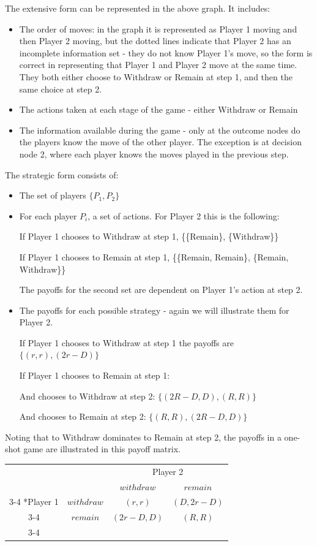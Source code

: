 \documentclass[11pt,a4paper]{article}
\begin{document}
The extensive form can be represented in the above graph. It includes:
\begin{itemize}
\item The order of moves: in the graph it is represented as Player 1 moving and then Player 2 moving, but the dotted lines indicate that Player 2 has an incomplete information set - they do not know Player 1's move, so the form is correct in representing that Player 1 and Player 2 move at the same time. They both either choose to Withdraw or Remain at step 1, and then the same choice at step 2. 
\item The actions taken at each stage of the game - either Withdraw or Remain
\item The information available during the game - only at the outcome nodes do the players know the move of the other player. The exception is at decision node 2, where each player knows the moves played in the previous step.
\end{itemize}
The strategic form consists of:
\begin{itemize}
\item The set of players $\{P_1, P_2\}$
\item For each player $P_i$, a set of actions. For Player 2 this is the following: 

If Player 1 chooses to Withdraw at step 1,  \{\{Remain\}, \{Withdraw\}\}

If Player 1 chooses to Remain at step 1, \{\{Remain, Remain\}, \{Remain, Withdraw\}\}

The payoffs for the second set are dependent on Player 1's action at step 2.

\item The payoffs for each possible strategy - again we will illustrate them for Player 2. 

If Player 1 chooses to Withdraw at step 1 the payoffs are $\{(r,r), (2r-D)\}$

If Player 1 chooses to Remain at step 1:

And chooses to Withdraw at step 2: $\{(2R-D, D),(R, R)\}$

And chooses to Remain at step 2: $\{(R, R),(2R-D, D)\}$
\end{itemize}

Noting that to Withdraw dominates to Remain at step 2, the payoffs in a one-shot game are illustrated in this payoff matrix.

\begin{table}[h]
    \setlength{\extrarowheight}{2pt}
    \begin{center}
    \begin{tabular}{cc|c|c|}
      & \multicolumn{1}{c}{} & \multicolumn{2}{c}{Player 2}\\
      & \multicolumn{1}{c}{} & \multicolumn{1}{c}{$withdraw$}  & \multicolumn{1}{c}{$remain$} \\\cline{3-4}
      \multirow{2}*{Player 1}  & $withdraw$ & $(r,r)$ & $(D,2r-D)$ \\\cline{3-4}
      & $remain$ & $(2r-D,D)$ & $(R, R)$ \\\cline{3-4}
	\end{tabular}
	\end{center}
\end{table} 
\end{document}
